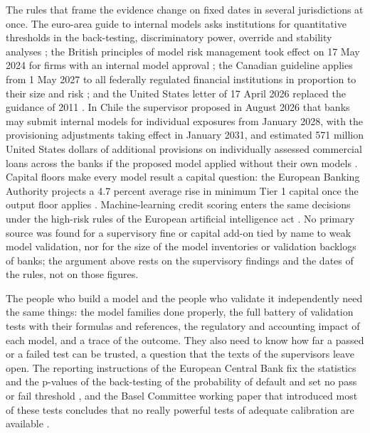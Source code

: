 The rules that frame the evidence change on fixed dates in several jurisdictions at once. The euro-area guide to internal models asks institutions for
quantitative thresholds in the back-testing, discriminatory power, override and stability analyses \citep{fr:ecbegim2026}; the British principles of
model risk management took effect on 17 May 2024 for firms with an internal model approval \citep{fr:pra2023}; the Canadian guideline applies from 1 May 2027
to all federally regulated financial institutions in proportion to their size and risk \citep{fr:osfie23}; and the United States letter of 17 April 2026
replaced the guidance of 2011 \citep{credit-scoring:sr262}. In Chile the supervisor proposed in August 2026 that banks may submit internal models for
individual exposures from January 2028, with the provisioning adjustments taking effect in January 2031, and estimated 571 million United States dollars of
additional provisions on individually assessed commercial loans across the banks if the proposed model applied without their own models
\citep{fr:cmf2026}. Capital floors make every model result a capital question: the European Banking Authority projects a 4.7 percent average rise in
minimum Tier 1 capital once the output floor applies \citep{fr:eba2026}. Machine-learning credit scoring enters the same decisions under the high-risk
rules of the European artificial intelligence act \citep{fr:aiact}. No primary source was found for a supervisory fine or capital add-on tied by name to weak
model validation, nor for the size of the model inventories or validation backlogs of banks; the argument above rests on the supervisory
findings and the dates of the rules, not on those figures.

The people who build a model and the people who validate it independently need the same things: the model families done properly, the full battery of
validation tests with their formulas and references, the regulatory and accounting impact of each model, and a trace of the outcome. They also need to know
how far a passed or a failed test can be trusted, a question that the texts of the supervisors leave open. The reporting instructions of the European Central Bank fix the
statistics and the p-values of the back-testing of the probability of default and set no pass or fail threshold \citep{credit-scoring:ecb2019}, and the Basel
Committee working paper that introduced most of these tests concludes that no really powerful tests of adequate calibration are available
\citep{credit-scoring:bcbswp14}.

